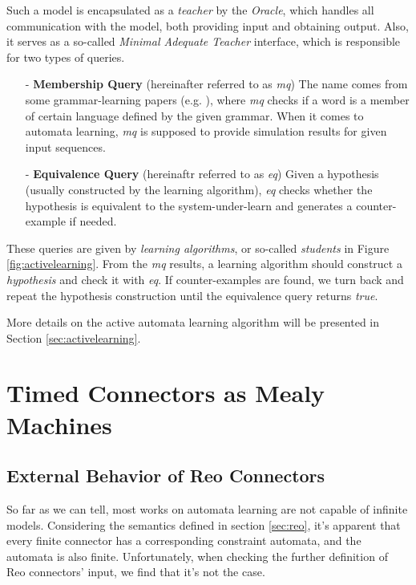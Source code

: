 \documentclass[conference, a4paper]{IEEEtran}
\begin{document}
Such a model is encapsulated as a \emph{teacher} by the \emph{Oracle}, which handles
all communication with the model, both providing input and obtaining output. Also, it serves as a
so-called \emph{Minimal Adequate Teacher} interface, which is responsible for two types of
queries. 

\begin{itemize}
  \item[-] \textbf{Membership Query} (hereinafter referred to as \emph{mq}) The name comes from
    some grammar-learning papers (e.g. \cite{DBLP:journals/iandc/Angluin87}), where \emph{mq} checks
    if a word is a member of certain language defined by the given grammar. When it comes to
    automata learning, \emph{mq} is supposed to provide simulation results for given input
    sequences.
  \item[-] \textbf{Equivalence Query} (hereinaftr referred to as \emph{eq}) Given a hypothesis
    (usually constructed by the learning algorithm), \emph{eq} checks whether the hypothesis is
    equivalent to the system-under-learn and generates a counter-example if needed.
\end{itemize}

These queries are given by \emph{learning algorithms}, or so-called \emph{students} in Figure
\ref{fig:activelearning}. From the \emph{mq} results, a learning algorithm should construct a
\emph{hypothesis} and check it with \emph{eq}. If counter-examples are found, we turn back and
repeat the hypothesis construction until the equivalence query returns \emph{true}.

More details on the active automata learning algorithm will be presented in Section
\ref{sec:activelearning}. 

\section{Timed Connectors as Mealy Machines}

\subsection{External Behavior of Reo Connectors}
So far as we can tell, most
works\cite{DBLP:conf/fase/RaffeltS06, DBLP:journals/corr/ChenHLLTWW15} on automata learning are not
capable of infinite models.  Considering the semantics defined in section
\ref{sec:reo}, it's apparent that every finite connector has a corresponding constraint
automata, and the automata is also finite. Unfortunately, when checking the further definition of
Reo connectors' input, we find that it's not the case.
\end{document}
